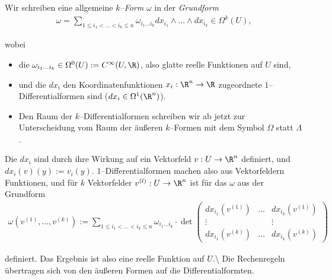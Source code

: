 \documentclass[letterpaper,10pt,english]{jupyterBook}
\begin{document}
\par
Wir schreiben eine allgemeine \emph{\(k\)–Form} \(\omega\) in der \emph{Grundform}
\begin{align*}
\omega = \sum_{1\leq i_1<\ldots<i_k\leq n}\omega_{i_1\ldots i_k}
dx_{i_1}\wedge\ldots\wedge dx_{i_k}\in\Omega^k(U),
\end{align*}
\par
wobei
\begin{itemize}
\item {} 
\par
die \(\omega_{i_1\ldots i_k}\in \Omega^0(U):=C^\infty(U,\R)\), also glatte reelle Funktionen auf \(U\) sind,

\item {} 
\par
und die \(dx_i\) den Koordinatenfunktionen \(x_i:\R^n\to\R\) zugeordnete \(1\)–Differentialformen sind (\(dx_i\in\Omega^1(\R^n)\)).

\item {} 
\par
Den Raum der \(k\)–Differentialformen schreiben wir ab jetzt zur Unterscheidung vom Raum der äußeren \(k\)–Formen mit dem Symbol \(\Omega\) statt \(\Lambda\).

\end{itemize}

\par
Die \(dx_i\) sind durch ihre Wirkung auf ein Vektorfeld \(v:U\to
\R^n\) definiert, und \(dx_i(v)( y) := v_i( y)\).
\(1\)–Differentialformen machen also aus Vektorfeldern Funktionen, und für \(k\) Vektorfelder \(v^{(l)}:U\to\R^n\) ist für das \(\omega\) aus der Grundform
\begin{align*}
\omega\left(v^{(1)},\ldots,v^{(k)}\right) := \sum_{1\leq i_1<\ldots<i_k\leq n}
\omega_{i_1\ldots i_k}\cdot\det\begin{pmatrix} dx_{i_1}(v^{(1)})&\ldots& dx_{i_k}(v^{(1)})\\
\vdots&&\vdots\\
dx_{i_1}(v^{(k)})&\ldots& dx_{i_k}(v^{(k)}) \end{pmatrix}
\end{align*}
\par
definiert. Das Ergebnis ist also eine reelle Funktion auf \(U\).\textbackslash{}
Die Rechenregeln übertragen sich von den äußeren Formen auf die Differentialformten.
\end{document}
